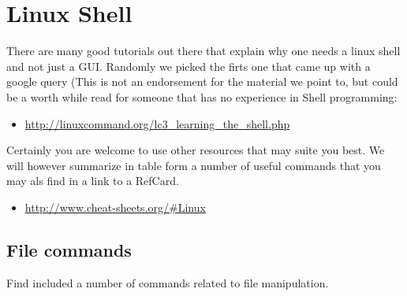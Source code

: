 \FILENAME

\section{Linux Shell}\label{linux-shell}

There are many good tutorials out there that explain why one needs a
linux shell and not just a GUI. Randomly we picked the firts one that
came up with a google query (This is not an endorsement for the material
we point to, but could be a worth while read for someone that has no
experience in Shell programming:

\begin{itemize}
\tightlist
\item
  \url{http://linuxcommand.org/lc3_learning_the_shell.php}
\end{itemize}

Certainly you are welcome to use other resources that may suite you
best. We will however summarize in table form a number of useful
commands that you may als find in a link to a RefCard.

\begin{itemize}
\tightlist
\item
  \url{http://www.cheat-sheets.org/\#Linux}
\end{itemize}

\subsection{File commands}\label{file-commands}

Find included a number of commands related to file manipulation.

